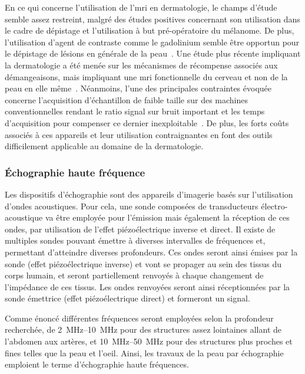 En ce qui concerne l'utilisation de l'\gls{mri} en dermatologie, le champs d'étude semble assez restreint, malgré des études positives concernant son utilisation dans le cadre de dépistage et l'utilisation à but pré-opératoire du mélanome. De plus, l'utilisation d'agent de contraste comme le gadolinium semble être opportun pour le dépistage de lésions en générale de la peau~\cite{Zemtsov1993}. Une étude plus récente impliquant la dermatologie a été menée sur les mécanismes de récompense associés aux démangeaisons, mais impliquant une \gls{mri} fonctionnelle du cerveau et non de la peau en elle même~\cite{Mueller2017}. Néanmoins, l'une des principales contraintes évoquée concerne l'acquisition d'échantillon de faible taille sur des machines conventionnelles rendant le ratio signal sur bruit important et les temps d'acquisition pour compenser ce dernier inexploitable~\cite{Gobel2016}. De plus, les forts coûts associés à ces appareils et leur utilisation contraignantes en font des outils difficilement applicable au domaine de la dermatologie.\par

\subsubsection{Échographie haute fréquence}
Les dispositifs d'échographie sont des appareils d'imagerie basés sur l'utilisation d'ondes acoustiques. Pour cela, une sonde composées de transducteurs électro-acoustique va être employée pour l'émission mais également la réception de ces ondes, par utilisation de l'effet piézoélectrique inverse et direct. Il existe de multiples sondes pouvant émettre à diverses intervalles de fréquences et, permettant d'atteindre diverses profondeurs. Ces ondes seront ainsi émises par la sonde (effet piézoélectrique inverse) et vont se propager au sein des tissus du corps humain, et seront partiellement renvoyés à chaque changement de l'impédance de ces tissus. Les ondes renvoyées seront ainsi réceptionnées par la sonde émettrice (effet piézoélectrique direct) et formeront un signal.\par

Comme énoncé différentes fréquences seront employées selon la profondeur recherchée, de  \SIrange{2}{10}{\mega\hertz} pour des structures assez lointaines allant de l'abdomen aux artères, et \SIrange{10}{50}{\mega\hertz} pour des structures plus proches et fines telles que la peau et l'oeil. Ainsi, les travaux de la peau par échographie emploient le terme d'échographie haute fréquences.\par


